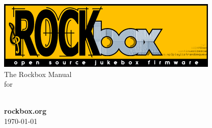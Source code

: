 \thispagestyle{empty}
\vspace*{0.3cm}
\begin{center}
{\includegraphics{frontpage/rockbox-web.png}}\\
\vspace{2cm}
\huge{The Rockbox Manual\\for\\\archosplayername}\vspace{1cm}\\

\vspace{\fill}

\large \textbf{rockbox.org}\ \\\today


\end{center}

\pagebreak
\thispagestyle{empty}
\cleardoublepage
